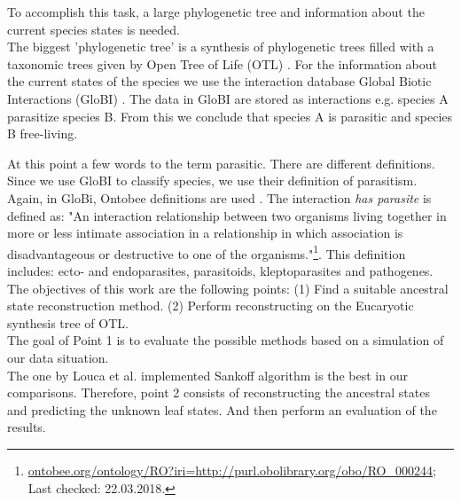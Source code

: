 
  To accomplish this task, a large phylogenetic tree and information about the current species states 
    is needed. \\
  The biggest 'phylogenetic tree' is a synthesis of phylogenetic trees filled with a taxonomic trees 
    given by Open Tree of Life (OTL) \cite{Hinchliff2015}. %
  For the information about the current states of the species we use the interaction database Global 
    Biotic Interactions (GloBI) \cite{Poelen2014}. The data in GloBI are stored as interactions e.g. 
    species A parasitize species B. From this we conclude that species A is parasitic and species B 
    free-living.

  At this point a few words to the term parasitic. There are different definitions. Since we use 
    GloBI to classify species, we use their definition of parasitism. Again, in GloBi, Ontobee 
    definitions are used \cite{Xiang2011}.
  The interaction \textit{has parasite} is defined as: "An interaction relationship between two 
    organisms living together in more or less intimate association in a relationship in which 
    association is disadvantageous or destructive to one of the organisms."\footnote{
      \hyperlink{http://www.ontobee.org/ontology/RO?iri=http://purl.obolibrary.org/obo/RO_0002445}
      {ontobee.org/ontology/RO?iri=http://purl.obolibrary.org/obo/RO\_000244}; Last checked: 22.03.2018.
    }. This definition includes: ecto- and endoparasites, parasitoids, kleptoparasites and pathogenes. \\

  The objectives of this work are the following points: (1) Find a suitable ancestral state 
    reconstruction method. (2) Perform reconstructing on the Eucaryotic synthesis tree of OTL. \\
  The goal of Point 1 is to evaluate the possible methods based on a simulation of our data 
    situation. \\
  The one by Louca et al. implemented Sankoff algorithm is the best in our comparisons. Therefore, 
    point 2 consists of reconstructing the ancestral states and predicting the unknown leaf states. 
    And then perform an evaluation of the results.

